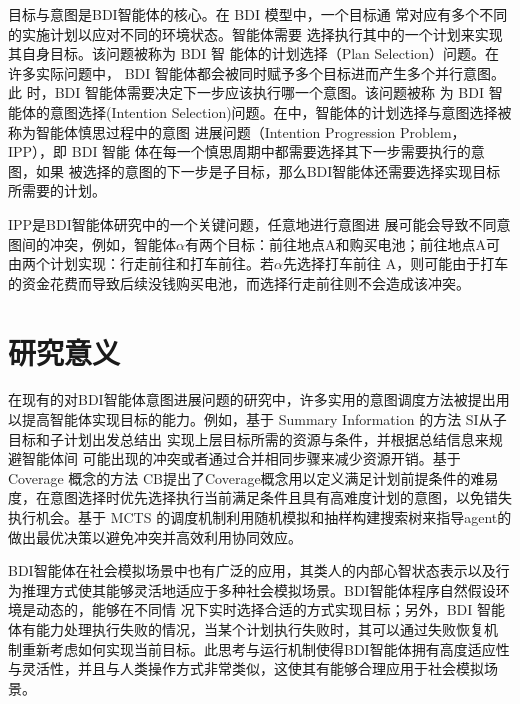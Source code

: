 目标与意图是BDI智能体的核心。在 BDI 模型中，一个目标通 常对应有多个不同的实施计划以应对不同的环境状态。智能体需要 选择执行其中的一个计划来实现其自身目标。该问题被称为 BDI 智 能体的计划选择（Plan Selection）问题\cite{yao2017robust}。在许多实际问题中， BDI 智能体都会被同时赋予多个目标进而产生多个并行意图。此 时，BDI 智能体需要决定下一步应该执行哪一个意图。该问题被称 为 BDI 智能体的意图选择(Intention Selection)问题\cite{yao2017robust}。在\cite{DBLP:conf/emas/Castle-GreenDL20}中，智能体的计划选择与意图选择被称为智能体慎思过程中的意图 进展问题（Intention Progression Problem， IPP），即 BDI 智能 体在每一个慎思周期中都需要选择其下一步需要执行的意图，如果 被选择的意图的下一步是子目标，那么BDI智能体还需要选择实现目标所需要的计划。


IPP是BDI智能体研究中的一个关键问题，任意地进行意图进 展可能会导致不同意图间的冲突，例如，智能体$\alpha$有两个目标：前往地点A和购买电池；前往地点A可由两个计划实现：行走前往和打车前往。若$\alpha$先选择打车前往 A，则可能由于打车的资金花费而导致后续没钱购买电池，而选择行走前往则不会造成该冲突。
\section{研究意义}
在现有的对BDI智能体意图进展问题的研究中，许多实用的意图调度方法被提出用以提高智能体实现目标的能力。例如，基于 Summary Information 的方法 SI\cite{DBLP:journals/jar/ThangarajahP11}从子目标和子计划出发总结出 实现上层目标所需的资源与条件，并根据总结信息来规避智能体间 可能出现的冲突或者通过合并相同步骤来减少资源开销。基于 Coverage 概念的方法 CB\cite{DBLP:journals/aamas/WatersPS15,DBLP:conf/atal/WatersPS14,DBLP:conf/aamas/ThangarajahSP12}提出了Coverage概念用以定义满足计划前提条件的难易度，在意图选择时优先选择执行当前满足条件且具有高难度计划的意图，以免错失执行机会。基于 MCTS 的调度机制\cite{DBLP:conf/aaai/YaoLT16,DBLP:conf/atal/YaoL16,DBLP:conf/ecai/YaoLT14,DBLP:conf/atal/Yao21,DBLP:conf/ijcai/Yao20,DBLP:conf/ecai/YaoLT16}利用随机模拟和抽样构建搜索树来指导agent的做出最优决策以避免冲突并高效利用协同效应。

BDI智能体在社会模拟场景中也有广泛的应用\cite{DBLP:conf/ijcai/SinghSPJ11}，其类人的内部心智状态表示以及行为推理方式使其能够灵活地适应于多种社会模拟场景。BDI智能体程序自然假设环境是动态的，能够在不同情 况下实时选择合适的方式实现目标；另外，BDI 智能体有能力处理执行失败的情况，当某个计划执行失败时，其可以通过失败恢复机 制重新考虑如何实现当前目标。此思考与运行机制使得BDI智能体拥有高度适应性与灵活性，并且与人类操作方式非常类似，这使其有能够合理应用于社会模拟场景。

